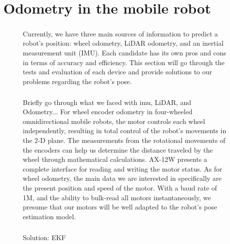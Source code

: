 \chapter{Odometry in the mobile robot}

\begin{figure} [H]

\paragraph*{}

Currently, we have three main sources of information to predict a robot's position: wheel odometry, LiDAR odometry, and an inertial measurement unit (IMU). Each candidate has its own pros and cons in terms of accuracy and efficiency. This section will go through the tests and evaluation of each device and provide solutions to our problems regarding the robot's pose.

\paragraph*{}
Briefly go through what we faced with imu, LiDAR, and Odometry...
For wheel encoder odometry in four-wheeled omnidirectional mobile robots, the motor controls each wheel independently, resulting in total control of the robot's movements in the 2-D plane. The measurements from the rotational movements of the encoders can help us determine the distance traveled by the wheel through mathematical calculations.
AX-12W presents a complete interface for reading and writing the motor status. As for wheel odometry, the main data we are interested in specifically are the present position and speed of the motor. With a baud rate of 1M, and the ability to bulk-read all motors instantaneously, we presume that our motors will be well adapted to the robot's pose estimation model. \cite{phunopas2018motion}

\paragraph*{}
Solution: EKF

\end{figure}
